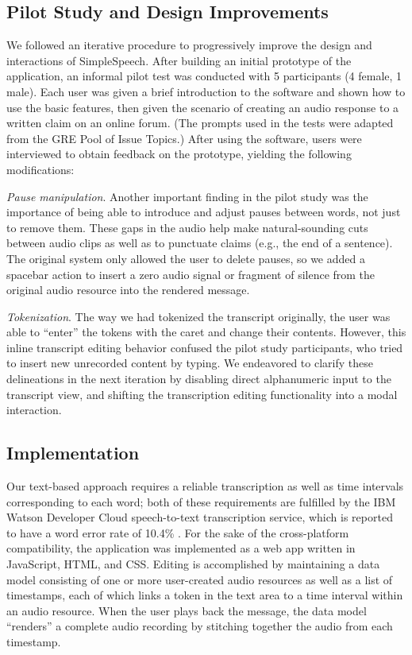\subsection{Pilot Study and Design Improvements}
We followed an iterative procedure to progressively improve the design and interactions of SimpleSpeech.
After building an initial prototype of the application, an informal pilot test was conducted with 5 participants (4 female, 1 male). 
Each user was given a brief introduction to the software and shown how to use the basic features, then given the scenario of creating an audio response to a written claim on an online forum. 
(The prompts used in the tests were adapted from the GRE Pool of Issue Topics.)
After using the software, users were interviewed to obtain feedback on the prototype, yielding the following modifications:

\emph{Pause manipulation}.
Another important finding in the pilot study was the importance of being able to introduce and adjust pauses between words, not just to remove them. 
These gaps in the audio help make natural-sounding cuts between audio clips as well as to punctuate claims (e.g., the end of a sentence). 
The original system only allowed the user to delete pauses, so we added a spacebar action to insert a zero audio signal or fragment of silence from the original audio resource into the rendered message. 

\emph{Tokenization}. 
The way we had tokenized the transcript originally, the user was able to ``enter'' the tokens with the caret and change their contents.
However, this inline transcript editing behavior confused the pilot study participants, who tried to insert new unrecorded content by typing. 
We endeavored to clarify these delineations in the next iteration by disabling direct alphanumeric input to the transcript view, and shifting the transcription editing functionality into a modal interaction.

\subsection{Implementation}
Our text-based approach requires a reliable transcription as well as time intervals corresponding to each word; both of these requirements are fulfilled by the IBM Watson Developer Cloud speech-to-text transcription service, which is reported to have a word error rate of 10.4\% \cite{soltau:2014}.
For the sake of the cross-platform compatibility, the application was implemented as a web app written in JavaScript, HTML, and CSS.
Editing is accomplished by maintaining a data model consisting of one or more user-created audio resources as well as a list of timestamps, each of which links a token in the text area to a time interval within an audio resource. 
When the user plays back the message, the data model ``renders'' a complete audio recording by stitching together the audio from each timestamp. 
